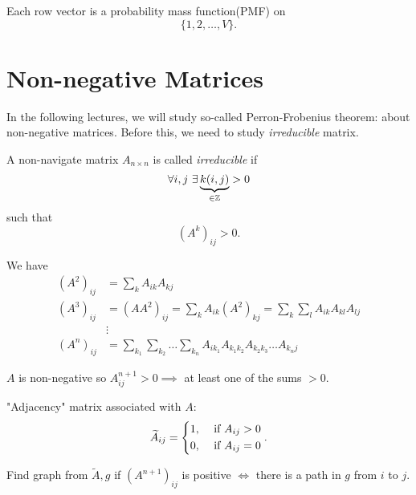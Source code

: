 \begin{remark}
	Each row vector is a probability mass function(PMF) on
	\[
		\{1, 2, \ldots , V\}.
	\]
\end{remark}


\section{Non-negative Matrices}
In the following lectures, we will study so-called Perron-Frobenius theorem: about non-negative matrices. Before this, we need to study
\emph{irreducible} matrix.

\begin{definition}
	A non-navigate matrix \(A_{n\times n}\) is called \emph{irreducible} if
	\[
		\forall i, j\ \exists \underbrace{k(i, j)}_{\in\mathbb{\MakeUppercase{Z}}}>0
	\]
	such that
	\[
		(A^k)_{ij}>0.
	\]
\end{definition}

We have
\[
	\begin{split}
		(A^2)_{ij} &= \sum\limits_{k} A_{ik}A_{kj}\\
		(A^3)_{ij} &= (A A^2)_{ij} = \sum\limits_{k} A_{ik}(A^2)_{kj} = \sum\limits_{k}\sum\limits_{l} A_{ik} A_{kl}A_{lj}\\
		&\vdots\\
		(A^n)_{ij} &= \sum\limits_{k_1}\sum\limits_{k_2}\ldots \sum\limits_{k_n}A_{ik_1}A_{k_1 k_2}A_{k_2 k_3}\ldots A_{k_n j}
	\end{split}
\]

\(A\) is non-negative so \(A^{n+1}_{ij} > 0\implies \) at least one of the sums \(>0\).

"Adjacency" matrix associated with \(A\):
\[
	\widetilde{A}_{ij} = \begin{dcases}
		1, & \text{ if }A_{ij}>0 \\
		0, & \text{ if }A_{ij}=0 \\
	\end{dcases}.
\]

Find graph from \(\widetilde{A}, g\) if \((A^{n+1})_{ij}\) is positive \(\iff\) there is a path in \(g\) from
\(i\) to \(j\).